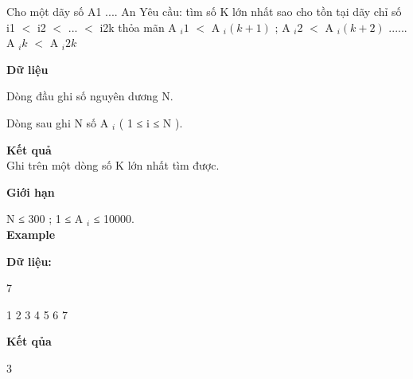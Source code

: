 



     Cho một  dãy số A1 .... An Yêu cầu: tìm số K lớn nhất sao cho tồn tại dãy chỉ số i1 $<$ i2 $<$ ... $<$ i2k thỏa mãn A     $_      i1     $     $<$ A     $_      i( k + 1 )     $     ; A     $_      i2     $     $<$ A     $_      i( k + 2 )     $     ...... A     $_      ik     $     $<$ A     $_      i2k     $

\textbf{      Dữ liệu     }

     Dòng đầu ghi số nguyên dương N.    

     Dòng sau ghi N số A     $_      i     $     ( 1 ≤ i ≤ N ).    

\textbf{       Kết quả      }
\\

     Ghi trên một dòng số K lớn nhất tìm được.    

\textbf{      Giới hạn     }

     N ≤ 300 ; 1 ≤ A     $_      i     $     ≤ 10000.     
\\

\textbf{      Example     }

\textbf{      Dữ liệu:     }

     7    

     1 2 3 4 5 6 7    

\textbf{      Kết qủa     }

     3    